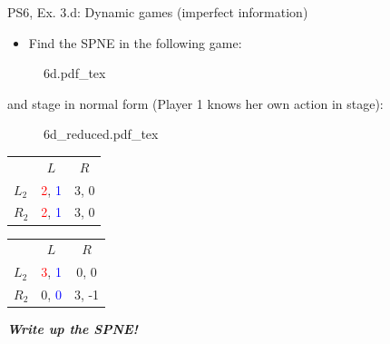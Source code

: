 \begin{frame}{PS6, Ex. 3.d: Dynamic games (imperfect information)}
    \begin{itemize}
      \item[(d)] Find the SPNE in the following game:
    \end{itemize}
    \vspace{-4pt}
    \begin{figure}[!h]
      \center
      \def\svgwidth{.8\columnwidth}
      {6d.pdf_tex}
    \end{figure}
    \vspace{-4pt}
     and  stage in normal form (Player 1 knows her own action in  stage):
    \vspace{-4pt}
    \begin{figure}[!h]
      \center
      \def\svgwidth{.25\columnwidth}
      {6d_reduced.pdf_tex}
    \end{figure}
    \vspace{-9pt}
    \begin{table}
      \begin{tabular}{l|c|c|}
        \multicolumn{1}{c}{} & \multicolumn{1}{c}{\color{blue}$L$} & \multicolumn{1}{c}{$R$} \\\cline{2-3}
        $L_2$ & \textcolor{red}{2}, \textcolor{blue}{1} & 3, 0 \\\cline{2-3}
        $R_2$ & \textcolor{red}{2}, \textcolor{blue}{1} & 3, 0 \\\cline{2-3}
      \end{tabular}
      \enskip
      \begin{tabular}{l|c|c|}
        \multicolumn{1}{c}{} & \multicolumn{1}{c}{\color{blue}$L$} & \multicolumn{1}{c}{$R$} \\\cline{2-3}
        $L_2$ & \textcolor{red}{3}, \textcolor{blue}{1} & 0, 0 \\\cline{2-3}
        $R_2$ & 0, \textcolor{blue}{0} & 3, -1 \\\cline{2-3}
      \end{tabular}
    \end{table}
    \vspace{-4pt}
    \textbf{\textit{Write up the SPNE!}}
    \vfill\null
\end{frame}

